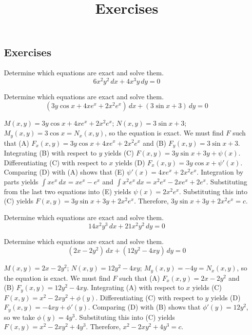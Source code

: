 \documentclass{ximera}
\title{Exercises} \license{CC BY-NC-SA 4.0}
\begin{document}
\begin{abstract}
\end{abstract}
\maketitle

\begin{onlineOnly}
\section*{Exercises}
\end{onlineOnly}


\begin{problem}\label{exer:2.5.1} Determine which equations are exact and solve them.
$$6x^2y^2\,dx+4x^3y\,dy=0$$
\end{problem}

\begin{problem}\label{exer:2.5.2} Determine which equations are exact and solve them.
$$(3y\cos x+4xe^x+2x^2e^x)\,dx+(3\sin x+3)\,dy=0$$

\begin{solution}
    $M(x,y)=3y\cos x+4xe^x+2x^2e^x$;\;
$N(x,y)=3\sin x+3$;\;
$M_y(x,y)=3\cos x=N_x(x,y)$,
so the  equation is exact.
We must find $F$ such that
(A) $F_x(x,y)=3y\cos x+4xe^x+2x^2e^x$ and
(B) $F_y(x,y)=3\sin x+3$.
Integrating (B) with respect to $y$ yields
(C) $F(x,y)=3y\sin x+3y+\psi(x)$.
Differentiating (C) with respect to $x$  yields
(D) $F_x(x,y)=3y\cos x+\psi'(x)$.
Comparing (D) with (A)  shows that
(E) $\psi'(x)=4xe^x+2x^2e^x$.
Integration by parts yields
$\int xe^x\,dx=xe^x-e^x$ and
$\int x^2e^x\,dx=x^2e^x-2xe^x+2e^x$.
Substituting from the last two equations into (E) yields
$\psi(x)=2x^2e^x$.
Substituting this into (C) yields
$F(x,y)=3y\sin x+3y+2x^2e^x$.
Therefore, $3y\sin x+3y+2x^2e^x=c$.
\end{solution}
\end{problem}

\begin{problem}\label{exer:2.5.3} Determine which equations are exact and solve them.
$$14x^2y^3\,dx+21 x^2y^2\,dy=0$$
\end{problem}

\begin{problem}\label{exer:2.5.4} Determine which equations are exact and solve them.
$$(2x-2y^2)\,dx+(12y^2-4xy)\,dy=0$$



\begin{solution}
    $M(x,y)=2x-2y^2$;\;
$N(x,y)=12y^2-4xy$;\;
$M_y(x,y)=-4y=N_x(x,y)$,
so the  equation is exact.
We must find $F$ such that
(A) $F_x(x,y)=2x-2y^2$ and
(B) $F_y(x,y)=12y^2-4xy$.
Integrating (A) with respect to $x$ yields
(C) $F(x,y)=x^2-2xy^2+\phi(y)$.
Differentiating (C) with respect to $y$  yields
(D) $F_y(x,y)=-4xy+\phi'(y)$.
Comparing (D) with (B)  shows that
$\phi'(y)=12y^2$, so we take
$\phi(y)=4y^3$.
Substituting this into (C) yields
$F(x,y)=x^2-2xy^2+4y^3$.
Therefore, $x^2-2xy^2+4y^3=c$.
\end{solution}
\end{problem}
\end{document}
